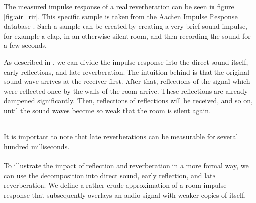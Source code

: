 The measured impulse response of a real reverberation can be seen in figure \ref{fig:air_rir}. This specific sample is taken from the Aachen Impulse Response database \cite{jeub2009binaural}. Such a sample can be created by creating a very brief sound impulse, for example a clap, in an otherwise silent room, and then recording the sound for a few seconds. 

As described in \cite{yoshioka2012making}, we can divide the impulse response into the direct sound itself, early reflections, and late reverberation. The intuition behind is that the original sound wave arrives at the receiver first. After that, reflections of the signal which were reflected once by the walls of the room arrive. These reflections are already dampened significantly. Then, reflections of reflections will be received, and so on, until the sound waves become so weak that the room is silent again. 
\\ \\
\begin{minipage}{\linewidth}
	\label{fig:air_rir}
\end{minipage}

It is important to note that late reverberations can be measurable for several hundred milliseconds.\\\\

To illustrate the impact of reflection and reverberation in a more formal way, we can use the decomposition into direct sound, early reflection, and late reverberation. We define a rather crude approximation of a room impulse response that subsequently overlays an audio signal with weaker copies of itself.

